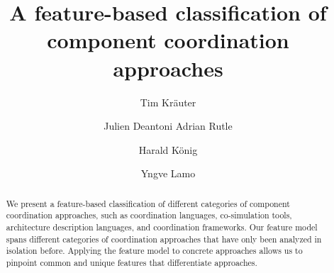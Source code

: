 \documentclass[runningheads]{llncs}
\begin{document}
\title{A feature-based classification of component coordination approaches}

\author{Tim Kr\"{a}uter \and
Julien Deantoni
Adrian Rutle \and
Harald K\"{o}nig \and
Yngve Lamo}
%
%
\maketitle

\begin{abstract}
We present a feature-based classification of different categories of component coordination approaches, such as coordination languages, co-simulation tools, architecture description languages, and coordination frameworks.
Our feature model spans different categories of coordination approaches that have only been analyzed in isolation before.
Applying the feature model to concrete approaches allows us to pinpoint common and unique features that differentiate approaches.
\end{abstract}


\end{document}
